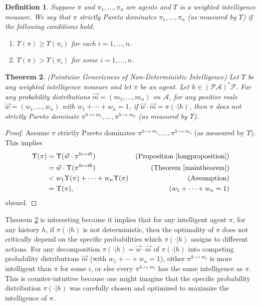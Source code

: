 \documentclass[twoside]{article}
\newtheorem{theorem}{Theorem}
\newtheorem{definition}[theorem]{Definition}
\begin{document}
\begin{definition}
    Suppose $\pi$ and $\pi_1,\ldots,\pi_n$ are agents and $\Upsilon$ is a
    weighted intelligence measure. We say that $\pi$ \emph{strictly Pareto dominates}
    $\pi_1,\ldots,\pi_n$ (as measured by $\Upsilon$) if the following conditions hold:
    \begin{enumerate}
        \item $\Upsilon(\pi)\geq \Upsilon(\pi_i)$ for each $i=1,\ldots,n$.
        \item $\Upsilon(\pi)>\Upsilon(\pi_i)$ for some $i=1,\ldots,n$.
    \end{enumerate}
\end{definition}

\begin{theorem}
\label{pointwisegenericnessthm}
    (Pointwise Genericness of Non-Deterministic Intelligence)
    Let $\Upsilon$ be any weighted intelligence measure and let
    $\pi$ be an agent.
    Let $h\in (\mathcal P\mathcal A)^*\mathcal P$.
    For any probability distributions $\vec m=(m_1,\ldots,m_n)$ on $\mathcal A$,
    for any positive reals $\vec w=(w_1,\ldots,w_n)$ with $w_1+\cdots+w_n=1$,
    if $\vec w\cdot\vec m=\pi(\cdot|h)$,
    then $\pi$ does not strictly Pareto dominate
    $\pi^{h\mapsto m_1},\ldots,\pi^{h\mapsto m_n}$
    (as measured by $\Upsilon$).
\end{theorem}

\begin{proof}
    Assume $\pi$ strictly Pareto dominates $\pi^{h\mapsto m_1},\ldots,\pi^{h\mapsto m_n}$
    (as measured by $\Upsilon$).
    This implies
    \begin{align*}
        \Upsilon(\pi)
            &= \Upsilon(\vec w\cdot\pi^{h\mapsto\vec m})
                &\mbox{(Proposition \ref{longproposition})}\\
            &= \vec w\cdot\Upsilon(\pi^{h\mapsto\vec m})
                &\mbox{(Theorem \ref{maintheorem})}\\
            &< w_1\Upsilon(\pi)+\cdots+w_n\Upsilon(\pi)
                &\mbox{(Assumption)}\\
            &= \Upsilon(\pi),
                &\mbox{($w_1+\cdots+w_n=1$)}
    \end{align*}
    absurd.
\end{proof}

Theorem \ref{pointwisegenericnessthm} is interesting because it implies that for
any intelligent agent $\pi$, for any history $h$, if $\pi(\cdot|h)$ is not deterministic,
then the optimality of $\pi$ does not critically depend on the specific probabilities
which $\pi(\cdot|h)$ assigns to different actions. For any decomposition
$\pi(\cdot|h)=\vec w\cdot\vec m$ of $\pi(\cdot|h)$ into competing probability
distributions $\vec m$
(with $w_1+\cdots+w_n=1$), either $\pi^{h\mapsto m_i}$ is more intelligent
than $\pi$ for some $i$, or else every $\pi^{h\mapsto m_i}$ has the same intelligence as
$\pi$. This is counter-intuitive because one might imagine that the specific probability
distribution $\pi(\cdot|h)$ was carefully chosen and optimized to maximize the intelligence
of $\pi$.
\end{document}
